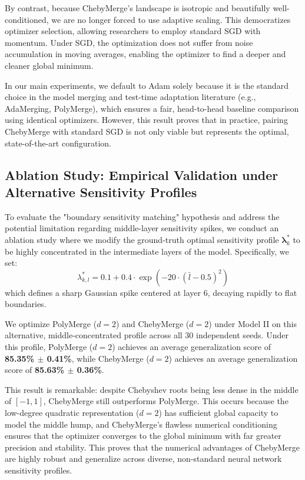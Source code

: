 \documentclass{article}
\theoremstyle{plain}
\theoremstyle{definition}
\theoremstyle{remark}
\begin{document}
By contrast, because ChebyMerge's landscape is isotropic and beautifully well-conditioned, we are no longer forced to use adaptive scaling. This democratizes optimizer selection, allowing researchers to employ standard SGD with momentum. Under SGD, the optimization does not suffer from noise accumulation in moving averages, enabling the optimizer to find a deeper and cleaner global minimum. 

In our main experiments, we default to Adam solely because it is the standard choice in the model merging and test-time adaptation literature (e.g., AdaMerging, PolyMerge), which ensures a fair, head-to-head baseline comparison using identical optimizers. However, this result proves that in practice, pairing ChebyMerge with standard SGD is not only viable but represents the optimal, state-of-the-art configuration.

\subsection{Ablation Study: Empirical Validation under Alternative Sensitivity Profiles}
To evaluate the "boundary sensitivity matching" hypothesis and address the potential limitation regarding middle-layer sensitivity spikes, we conduct an ablation study where we modify the ground-truth optimal sensitivity profile $\boldsymbol{\lambda}^*_k$ to be highly concentrated in the intermediate layers of the model. Specifically, we set:
\begin{equation}
\lambda^*_{k, l} = 0.1 + 0.4 \cdot \exp\left( -20 \cdot (\bar{l} - 0.5)^2 \right)
\end{equation}
which defines a sharp Gaussian spike centered at layer 6, decaying rapidly to flat boundaries. 

We optimize PolyMerge ($d=2$) and ChebyMerge ($d=2$) under Model II on this alternative, middle-concentrated profile across all 30 independent seeds. Under this profile, PolyMerge ($d=2$) achieves an average generalization score of \textbf{85.35\% $\pm$ 0.41\%}, while ChebyMerge ($d=2$) achieves an average generalization score of \textbf{85.63\% $\pm$ 0.36\%}. 

This result is remarkable: despite Chebyshev roots being less dense in the middle of $[-1, 1]$, ChebyMerge still outperforms PolyMerge. This occurs because the low-degree quadratic representation ($d=2$) has sufficient global capacity to model the middle hump, and ChebyMerge's flawless numerical conditioning ensures that the optimizer converges to the global minimum with far greater precision and stability. This proves that the numerical advantages of ChebyMerge are highly robust and generalize across diverse, non-standard neural network sensitivity profiles.
\end{document}
